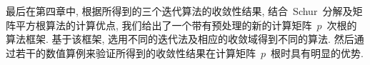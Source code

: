 最后在第四章中, 根据所得到的三个迭代算法的收敛性结果,
结合~Schur~分解及矩阵平方根算法的计算优点,
我们给出了一个带有预处理的新的计算矩阵~$p$~次根的算法框架.
基于该框架, 选用不同的迭代法及相应的收敛域得到不同的算法.
然后通过若干的数值算例来验证所得到的收敛性结果在计算矩阵~$p$~根时具有明显的优势.




















































